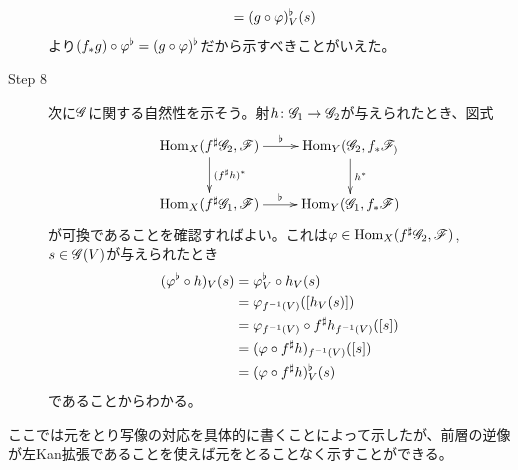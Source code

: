 \begin{description}
\begin{align*}
    &= (g \circ {\varphi})^{\flat}_V (s)
  \end{align*}
  より$(f_* g) \circ {\varphi}^{\flat} = (g \circ {\varphi})^{\flat}$だから示すべきことがいえた。
    \item[Step 8] 次に$\mathscr{G}$に関する自然性を示そう。射$h \colon \mathscr{G}_1 \to \mathscr{G}_2$が与えられたとき、図式
    \[
    \xymatrix{
    \Hom_X(f^{\sh}\scrg_2, \scrf) \ar[r]^-{\fl} \ar[d]^-{(f^{\sh}h)^*} & \Hom_Y(\scrg_2,f_*\scrf_) \ar[d]^-{h^*} \\
    \Hom_X(f^{\sh}\scrg_1, \scrf) \ar[r]^-{\fl} & \Hom_Y(\scrg_1,f_*\scrf)
    }
    \]
    が可換であることを確認すればよい。これは${\varphi} \in \operatorname{Hom}_X(f^{\sharp}\mathscr{G}_2, \mathscr{F})$, $s \in \mathscr{G}(V)$が与えられたとき
    \begin{align*}
      ({\varphi}^{\flat} \circ h)_V (s) &= {\varphi}^{\flat}_V \circ h_V (s) \\
      &= {\varphi}_{f^{-1}(V)} ( [h_V(s)]) \\
      &= {\varphi}_{f^{-1}(V)} \circ f^{\sharp}h_{f^{-1}(V)} ([s]) \\
      &= ({\varphi} \circ f^{\sharp}h)_{f^{-1}(V)} ([s]) \\
      &= ({\varphi} \circ f^{\sharp}h )_V^{\flat} (s)
    \end{align*}
    であることからわかる。
\end{description}

\begin{rem}
ここでは元をとり写像の対応を具体的に書くことによって示したが、前層の逆像が左Kan拡張であることを使えば元をとることなく示すことができる。
\end{rem}
